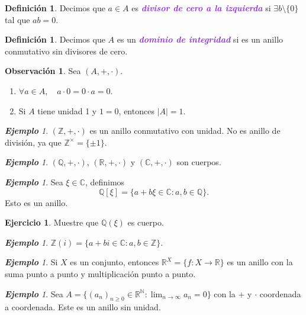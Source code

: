 \documentclass{article}
\theoremstyle{definition}
\newtheorem{definition}[theorem]{Definición}
\newtheorem{exercise}{Ejercicio}
\newtheorem*{obs}{Observación}
\theoremstyle{remark}
\newtheorem{example}[theorem]{\textbf{Ejemplo}}
\numberwithin{equation}{section}
\newcommand{\C}{\mathbb{C}}
\newcommand{\N}{\mathbb{N}}
\newcommand{\Q}{\mathbb{Q}}
\newcommand{\R}{\mathbb{R}}
\newcommand{\Z}{\mathbb{Z}}
\newcommand{\oo}{\infty}
\renewcommand{\c}{\cdot}
\newcommand{\abs}[1]{\left| #1 \right|}
\newcommand{\ds}{\displaystyle}
\newcommand{\wea}[1]{\textcolor{BlueViolet}{\textbf{\emph{#1}}}}
\begin{document}
\begin{definition}
  Decimos que $a \in A$ es \wea{divisor de cero a la izquierda} si $\exists b \setminus \{0\}$ tal que $ab = 0$.
\end{definition}

\begin{definition}
  Decimos que $A$ es un \wea{dominio de integridad} si es un anillo conmutativo sin divisores de cero.
\end{definition}

\begin{obs}
  Sea $(A,+,\c)$.
  \begin{enumerate}[(1)]
    \item $\forall a \in A, \quad a \c 0 = 0 \c a = 0$.
    \item Si $A$ tiene unidad 1 y $1=0$, entonces $\abs A = 1$.
  \end{enumerate}
\end{obs}

\begin{example}
  $(\Z,+,\c)$ es un anillo conmutativo con unidad. No es anillo de división, ya que $\Z^\times = \{\pm 1\}$.
\end{example}

\begin{example}
  $(\Q,+,\c)$, $(\R,+,\c)$ y $(\C,+,\c)$ son cuerpos.
\end{example}

\begin{example}
  Sea $\xi \in \C$, definimos 
  \[ \Q[\xi] = \{a + b \xi \in \C : a,b \in \Q\}. \]
  Esto es un anillo.
\end{example}

\begin{exercise}
  Muestre que $\Q(\xi)$ es cuerpo.
\end{exercise}

\begin{example}
  $\Z(i) = \{a+bi \in \C \colon a,b \in \Z\}$.
\end{example}

\begin{example}
  Si $X$ es un conjunto, entonces $\R^X = \{f \colon X \to \R\}$ es un anillo con la suma punto a punto y multiplicación punto a punto.
\end{example}

\begin{example}
  Sea $\ds A = \{(a_n)_{n \geq 0} \in \R^\N \colon \lim_{n\to\oo} a_n = 0\}$ con la $+$ y $\c$ coordenada a coordenada. Este es un anillo sin unidad.
\end{example}
\end{document}
